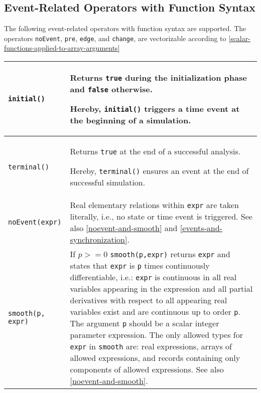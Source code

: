 \subsection{Event-Related Operators with Function Syntax}\label{event-related-operators-with-function-syntax}

The following event-related operators with function syntax are
supported. The operators \lstinline!noEvent!, \lstinline!pre!, \lstinline!edge!, and \lstinline!change!, are
vectorizable according to \cref{scalar-functions-applied-to-array-arguments}

\begin{longtable}{|p{5cm}|p{8cm}|}
\hline \endhead

\lstinline!initial()! & Returns \lstinline!true! during the initialization phase and \lstinline!false!
otherwise.
\par
\begin{nonnormative*}
Hereby, \lstinline!initial()! triggers a time event at the beginning of a simulation.
\end{nonnormative*}
\\ \hline

\lstinline!terminal()! & Returns \lstinline!true! at the end of a successful analysis.
\par
\begin{nonnormative*}
Hereby, \lstinline!terminal()! ensures an event at the end of successful simulation.
\end{nonnormative*}
\\ \hline

\lstinline!noEvent(expr)! & Real elementary relations within \lstinline!expr! are taken literally, i.e., no state or time event is triggered. See also \cref{noevent-and-smooth} and \cref{events-and-synchronization}.\\ \hline

\lstinline!smooth(p, expr)! & If $p>=0$ \lstinline!smooth(p,expr)!
returns \lstinline!expr! and states that \lstinline!expr! is \lstinline!p! times continuously
differentiable, i.e.: \lstinline!expr! is continuous in all real variables appearing
in the expression and all partial derivatives with respect to all
appearing real variables exist and are continuous up to order
\lstinline!p!. The argument \lstinline!p! should be a scalar integer parameter
expression. The only allowed types for \lstinline!expr! in \lstinline!smooth! are: real
expressions, arrays of allowed expressions, and records containing only
components of allowed expressions. See also \cref{noevent-and-smooth}.\\ \hline


\end{longtable}
